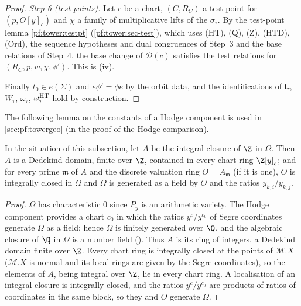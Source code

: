 \begin{proof}
\emph{Step 6 (test points).} Let $c$ be a chart, $(C,R_C)$ a test point for $(p,O[y]_c)$ and $\chi$ a family of
multiplicative lifts of the $\sigma_\tau$. By the test-point lemma \cref{pf:tower:testpt} (\cref{pf:tower:sec-test}), which uses
(HT), (Q), (Z), (HTD), (Ord), the sequence hypotheses and dual congruences of Step~3 and the base relations of Step~4, the base
change of $\mathcal D(c)$ satisfies the test relations for $(R_C,p,w,\chi,\phi')$. This is (iv).

Finally $t_0\in e(\Sigma)$ and $e\phi'=\phi e$ by the orbit data, and the identifications of $\mathfrak l_\tau$, $W_\tau$,
$\omega_\tau$, $\omega^{\mathrm{HT}}_\tau$ hold by construction.
\end{proof}

The following lemma on the constants of a Hodge component is used in \cref{sec:pf:towergeo} (in the proof of the Hodge
comparison).

\begin{lemma}\label{pf:tower:coordideal}
In the situation of this subsection, let $A$ be the integral closure of $\Z$ in $\Omega$. Then $A$ is a Dedekind domain, finite
over $\Z$, contained in every chart ring $\Z[y]_c$; and for every prime $\mathfrak m$ of $A$ and the discrete valuation ring
$O=A_{\mathfrak m}$ (if it is one), $O$ is integrally closed in $\Omega$ and $\Omega$ is generated as a field by $O$ and the
ratios $y_{k,i}/y_{k,j}$.
\end{lemma}

\begin{proof}
$\Omega$ has characteristic $0$ since $P_y$ is an arithmetic variety. The Hodge component provides a chart $c_0$ in which the
ratios $y^{c}/y^{c_0}$ of Segre coordinates generate $\Omega$ as a field; hence $\Omega$ is finitely generated over $\Q$, and the
algebraic closure of $\Q$ in $\Omega$ is a number field
(). Thus $A$ is its ring of integers, a Dedekind
domain finite over $\Z$. Every chart ring is integrally closed at the points of $\mathcal M.X$ ($\mathcal M.X$ is normal and its
local rings are given by the Segre coordinates), so the elements of $A$, being integral over $\Z$, lie in every chart ring. A
localisation of an integral closure is integrally closed, and the ratios $y^c/y^{c_0}$ are products of ratios of coordinates
in the same block, so they and $O$ generate $\Omega$.
\end{proof}

